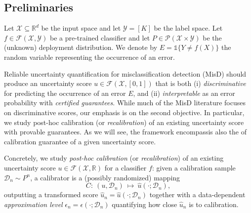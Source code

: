 \documentclass{article}
\theoremstyle{plain}
\theoremstyle{definition}
\theoremstyle{remark}
\begin{document}
\subsection{Preliminaries}

Let $\mathcal{X}\subseteq\mathbb{R}^d$ be the input space and let $\mathcal{Y}=[K]$ be the label space.
Let $f\in\mathcal{F}(\mathcal{X},\mathcal{Y})$ be a pre-trained classifier and let $P\in\mathcal{P}(\mathcal{X}\times\mathcal{Y})$ be the (unknown) deployment distribution. We denote by $E = \mathds{1}\{ Y \neq f(X)\}$ the random variable representing the occurrence of an error.

Reliable uncertainty quantification for misclassification detection (MisD) should produce an uncertainty score $u\in\mathcal{F}(\mathcal{X},[0,1])$ that is both
(i) \emph{discriminative} for predicting the occurrence of an error $E$, and
(ii) \emph{interpretable} as an error probability with \textit{certified guarantees}.
While much of the MisD literature focuses on discriminative scores, our emphasis is on the second objective. In particular, we study post-hoc calibration (or \emph{recalibration}) of an existing uncertainty score with provable guarantees. As we will see, the framework encompassis also the  of calibration guarantee of a given uncertainty score.


Concretely, we study \emph{post-hoc calibration} (or \emph{recalibration}) of an existing uncertainty score $u \in \mathcal{F}(\mathcal{X}, \mathbb{R})$ for a classifier $f$:
given a calibration sample $\mathcal{D}_n\sim P^n$, a calibrator is a (possibly randomized) mapping
\[
C:\ (u,\mathcal{D}_n)\ \longmapsto\ \widehat u(\cdot ; \mathcal{D}_n),
\] outputting a transformed score $\widehat{u}_n = \widehat u(\cdot ; \mathcal{D}_n)$ together with a data-dependent \textit{approximation level} $\epsilon_n = \epsilon( \cdot ; \mathcal{D}_n)$ quantifying how close 
$\widehat u_n$ is to calibration.



\end{document}
